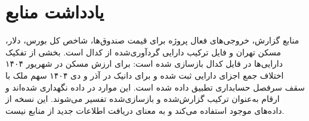 \documentclass[12pt,a4paper]{article}
\begin{document}
\section{یادداشت منابع}

منابع گزارش، خروجی‌های فعال پروژه برای قیمت صندوق‌ها، شاخص کل بورس، دلار، مسکن تهران و فایل ترکیب دارایی گردآوری‌شده از کدال است. بخشی از تفکیک دارایی‌ها در فایل کدال بازسازی شده است: برای ارزش مسکن در شهریور ۱۴۰۴ اختلاف جمع اجزای دارایی ثبت شده و برای دانیک در آذر و دی ۱۴۰۴ سهم ملک با سقف سرفصل حسابداری تطبیق داده شده است. این موارد در داده نگهداری شده‌اند و ارقام به‌عنوان ترکیب گزارش‌شده و بازسازی‌شده تفسیر می‌شوند. این نسخه از داده‌های موجود استفاده می‌کند و به معنای دریافت اطلاعات جدید از منابع نیست.
\end{document}
